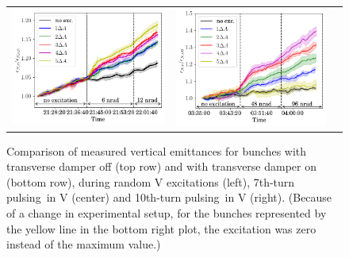 \documentclass[aps
,prstab
,reprint
,longbibliography
,preprintnumbers
,showkeys
,amsfonts,amssymb,amsmath
,floatfix
]{revtex4-1}
\newcommand{\seventhtp}{7th-turn pulsing}
\newcommand{\tenthtp}{10th-turn pulsing}
\newlength{\thirdwidth}
\begin{document}
\begin{figure}
\begin{tabular}{ccc}
    \includegraphics[width=\thirdwidth]{2017_emitv_avg_rel_v7th_with_damper_no_text.png} &
    \includegraphics[width=\thirdwidth]{2016_emitv_avg_rel_v10th_with_damper_no_text.png} \\
    \end{tabular}
    \caption{Comparison of measured vertical emittances for bunches
      with transverse damper off (top row) and with transverse damper
      on (bottom row), during random V excitations (left), \seventhtp\
      in V (center) and \tenthtp\ in V (right). (Because of a change
      in experimental setup, for the bunches represented by the yellow
      line in the bottom right plot, the excitation was zero instead
      of the maximum value.)}
    \label{fig:damp}
\end{figure}
\end{document}
